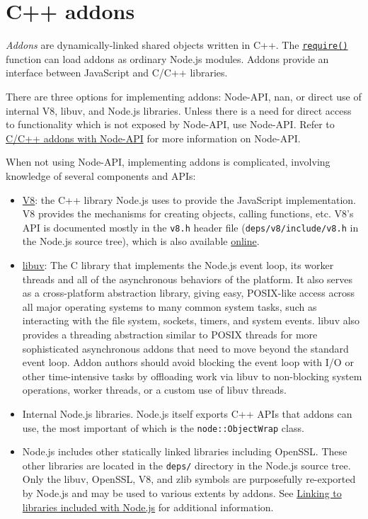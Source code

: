 \section{C++ addons}\label{c-addons}

\emph{Addons} are dynamically-linked shared objects written in C++. The
\href{modules.md\#requireid}{\texttt{require()}} function can load
addons as ordinary Node.js modules. Addons provide an interface between
JavaScript and C/C++ libraries.

There are three options for implementing addons: Node-API, nan, or
direct use of internal V8, libuv, and Node.js libraries. Unless there is
a need for direct access to functionality which is not exposed by
Node-API, use Node-API. Refer to \href{n-api.md}{C/C++ addons with
Node-API} for more information on Node-API.

When not using Node-API, implementing addons is complicated, involving
knowledge of several components and APIs:

\begin{itemize}
\item
  \href{https://v8.dev/}{V8}: the C++ library Node.js uses to provide
  the JavaScript implementation. V8 provides the mechanisms for creating
  objects, calling functions, etc. V8's API is documented mostly in the
  \texttt{v8.h} header file (\texttt{deps/v8/include/v8.h} in the
  Node.js source tree), which is also available
  \href{https://v8docs.nodesource.com/}{online}.
\item
  \href{https://github.com/libuv/libuv}{libuv}: The C library that
  implements the Node.js event loop, its worker threads and all of the
  asynchronous behaviors of the platform. It also serves as a
  cross-platform abstraction library, giving easy, POSIX-like access
  across all major operating systems to many common system tasks, such
  as interacting with the file system, sockets, timers, and system
  events. libuv also provides a threading abstraction similar to POSIX
  threads for more sophisticated asynchronous addons that need to move
  beyond the standard event loop. Addon authors should avoid blocking
  the event loop with I/O or other time-intensive tasks by offloading
  work via libuv to non-blocking system operations, worker threads, or a
  custom use of libuv threads.
\item
  Internal Node.js libraries. Node.js itself exports C++ APIs that
  addons can use, the most important of which is the
  \texttt{node::ObjectWrap} class.
\item
  Node.js includes other statically linked libraries including OpenSSL.
  These other libraries are located in the \texttt{deps/} directory in
  the Node.js source tree. Only the libuv, OpenSSL, V8, and zlib symbols
  are purposefully re-exported by Node.js and may be used to various
  extents by addons. See
  \hyperref[linking-to-libraries-included-with-nodejs]{Linking to
  libraries included with Node.js} for additional information.
\end{itemize}

